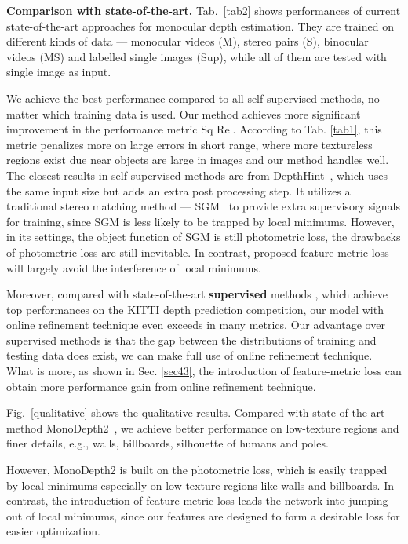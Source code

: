 \documentclass[runningheads]{llncs}
\begin{document}
\vspace{2pt}
\textbf{Comparison with state-of-the-art.}
Tab.~\ref{tab2} shows performances of current state-of-the-art approaches for monocular depth estimation. 
They are trained on different kinds of data --- monocular videos (M), stereo pairs (S), binocular videos (MS) and labelled single images (Sup), while all of them are tested with single image as input.


We achieve the best performance compared to all self-supervised methods, no matter which training data is used. 
Our method achieves more significant improvement in the performance metric Sq Rel. According to Tab. \ref{tab1}, this metric penalizes more on large errors in short range, where more textureless regions exist due near objects are large in images and our method handles well.
The closest results in self-supervised methods are from DepthHint~\cite{depthhint}, which uses the same input size but adds an extra post processing step.
It utilizes a traditional stereo matching method --- SGM~\cite{sgm} to provide extra supervisory signals for training, since SGM is less likely to be trapped by local minimums.
However, in its settings, the object function of SGM is still photometric loss, the drawbacks of photometric loss are still inevitable.
In contrast, proposed feature-metric loss will largely avoid the interference of local minimums.

Moreover, compared with state-of-the-art \textbf{supervised} methods \cite{dorn,bts}, which achieve top performances on the KITTI depth prediction competition, our model with online refinement technique even exceeds in many metrics. 
Our advantage over supervised methods is that the gap between the distributions of training and testing data does exist, we can make full use of online refinement technique.
What is more, as shown in Sec. \ref{sec43}, the introduction of feature-metric loss can obtain more performance gain from online refinement technique.

Fig.~\ref{qualitative} shows the qualitative results. 
Compared with state-of-the-art method MonoDepth2~\cite{monodepth2}, we achieve better performance on low-texture regions and finer details, e.g., walls, billboards, silhouette of humans and poles.

However, MonoDepth2 is built on the photometric loss, which is easily trapped by local minimums especially on low-texture regions like walls and billboards.
In contrast, the introduction of feature-metric loss leads the network into jumping out of local minimums, since our features are designed to form a desirable loss for easier optimization.
\end{document}
